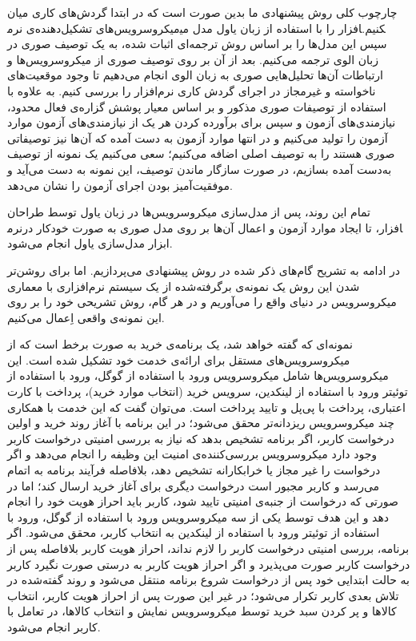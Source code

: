

چارچوب کلی روش پیشنهادی ما بدین صورت است که در ابتدا گردش‌های کاری میان میکروسرویس‌های تشکیل‌دهنده‌ی نرم‎افزار را با استفاده از زبان یاول مدل می‎کنیم. سپس این مدل‌ها را بر اساس روش ترجمه‌ای اثبات شده، به یک توصیف صوری در زبان الوی ترجمه می‌کنیم. بعد از آن بر روی توصیف صوری از میکروسرویس‌ها و ارتباطات آن‌ها تحلیل‌هایی صوری به زبان الوی انجام می‌دهیم تا وجود موقعیت‌های ناخواسته و غیرمجاز در اجرای گردش کاری نرم‌افزار را بررسی کنیم. به علاوه با استفاده از توصیفات صوری مذکور و بر اساس معیار پوشش گزاره‌ی فعال محدود، نیازمندی‌های آزمون و سپس برای برآورده کردن هر یک از نیازمندی‌های آزمون موارد آزمون را تولید می‌کنیم و در انتها موارد آزمون به دست آمده که آن‌ها نیز توصیفاتی صوری هستند را به توصیف اصلی اضافه می‌کنیم؛ سعی می‌کنیم یک نمونه از توصیف به‌دست آمده بسازیم، در صورت سازگار ماندن توصیف، این نمونه به دست می‌آید و موفقیت‌آمیز بودن اجرای آزمون را نشان می‌دهد. 

تمام این روند، پس از مدل‌سازی میکروسرویس‌ها در زبان یاول توسط طراحان نرم‎افزار، تا ایجاد موارد آزمون و اعمال آن‌ها بر روی مدل صوری به صورت خودکار در ابزار مدل‌سازی یاول انجام می‌شود.

در ادامه به تشریح گام‌های ذکر شده در روش پیشنهادی می‌پردازیم. اما برای روشن‌تر شدن این روش یک نمونه‌‌ی برگرفته‌شده از یک سیستم نرم‌افزاری با معماری میکروسرویس در دنیای واقع را می‌آوریم و در هر گام، روش تشریحی خود را بر روی این نمونه‌ی واقعی اِعمال می‌کنیم. 

نمونه‌ای که گفته ‌خواهد شد، یک برنامه‌ی خرید به صورت برخط است که از میکروسرویس‌های مستقل برای ارائه‌ی خدمت خود تشکیل شده‌ است. این میکروسرویس‌ها شامل میکروسرویس ورود با استفاده از گوگل، ورود با استفاده از توئیتر ورود با استفاده از لینکدین، سرویس خرید (انتخاب موارد خرید)، پرداخت با کارت اعتباری، پرداخت با پی‌پل و تایید پرداخت است. می‌توان گفت که این خدمت با همکاری چند میکروسرویس ریزدانه‌تر محقق می‌شود؛ در این برنامه با آغاز روند خرید و اولین درخواست کاربر، اگر برنامه تشخیص بدهد که  نیاز به بررسی امنیتی درخواست کاربر وجود دارد میکروسرویس بررسی‌کننده‌ی امنیت این وظیفه را انجام می‌دهد و اگر درخواست را غیر مجاز یا خرابکارانه تشخیص دهد، بلافاصله فرآیند برنامه به اتمام می‌رسد و کاربر مجبور است درخواست دیگری برای آغاز خرید ارسال کند؛ اما در صورتی که درخواست از جنبه‌ی امنیتی تایید شود، کاربر باید احراز هویت خود را انجام دهد و این هدف توسط یکی از سه میکروسرویس ورود با استفاده از گوگل، ورود با استفاده از توئیتر ورود با استفاده از لینکدین به انتخاب کاربر، محقق می‌شود. اگر برنامه، بررسی امنیتی درخواست کاربر را لازم نداند، احراز هویت کاربر بلافاصله پس از درخواست کاربر صورت می‌پذیرد و اگر احراز هویت کاربر به درستی صورت نگیرد کاربر به حالت ابتدایی خود پس از درخواست شروع برنامه منتقل می‌شود و روند گفته‌‌شده در تلاش بعدی کاربر تکرار می‌شود؛ در غیر این صورت پس از احراز هویت کاربر، انتخاب کالاها و پر کردن سبد خرید توسط میکروسرویس نمایش و انتخاب کالاها، در تعامل با کاربر انجام می‌شود. 

